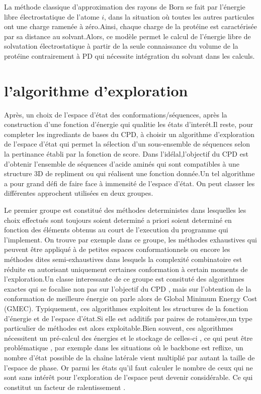 La méthode classique d'approximation des rayons de Born se fait par l'énergie libre électrostatique de l'atome $i$, dans la situation où toutes les autres particules ont une charge ramenée à zéro.Ainsi, chaque charge  de la protéine est caractérisée par sa distance au solvant.Alors, ce modèle permet le calcul de l'énergie libre de solvatation électrostatique à partir de la seule connaissance du volume de la protéine contrairement à PD qui nécessite intégration du solvant dans les calculs.
\label{NEA}

\section{l'algorithme d'exploration}

Après, un choix de l'espace d'état des conformations/séquences, après la construction d'une fonction d'énergie qui qualitie les états d'interét.Il reste, pour completer les ingrediants de bases du CPD, à choisir un algorithme d'exploration de l'espace d'état qui permet la sélection d'un sous-ensemble de séquences selon la pertinance établi par la fonction de score. Dans l'idélal,l'objectif du CPD est d'obtenir l'ensemble de séquences d'acide aminés qui sont compatibles à une structure 3D de repliment ou qui réalisent une fonction donnée.Un tel algorithme a pour grand défi de faire face à immensité de l'espace d'état. On peut classer les différentes approchent utilisées en deux groupes.

  Le premier groupe est constitué des méthodes deterministes dans lesquelles les choix effectués sont toujours soient determiné  a priori soient determiné en fonction des éléments obtenus au court de l'execution du programme qui l'implement. On trouve par exemple dans ce groupe, les méthodes exhaustives qui peuvent être appliqué à de petites espaces conformationnels ou encore les méthodes dites semi-exhaustives dans lesquels la complexité combinatoire est réduite en autorisant uniquement  certaines conformation à certain moments de l'exploration.Un classe interessante de ce groupe est consituté des algorithmes exactes qui se focalise non pas sur l'objectif du  CPD , mais sur l'obtention  de la conformation  de meilleure  énergie on parle alors de \og Global Minimum Energy Cost \fg (GMEC).
Typiquement, ces algorithmes exploitent les structures de la fonction d'énergie et de l'espace d'état.Si elle est additifs par paires de rotamères,un type particulier de méthodes est alors exploitable.Bien souvent, ces algorithmes  nécessitent un pré-calcul des énergies et le stockage de celles-ci , ce qui peut être problématique , par exemple dans les situations où le backbone est reflixe, un nombre d'état possible de la chaîne latérale vient multiplié par autant la taille de l'espace de phase. Or parmi les états qu'il faut calculer le nombre de ceux qui ne sont sans intérêt pour l'exploration de l'espace peut devenir considérable. Ce qui constitut un facteur de ralentissement . 
  
